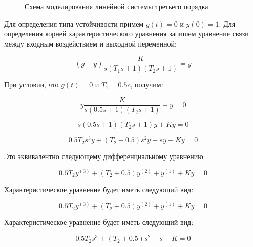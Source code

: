 \documentclass[a4paper, 11pt]{article}
\begin{document}
\begin{figure}[h!]
\caption{Схема моделирования линейной системы третьего порядка}
\label{ris:image}
\end{figure}

\par
	Для определения типа устойчивости примем $g(t)=0$ и  $y(0)=1$. Для определения корней характеристического уравнения запишем уравнение связи между входным воздействием и выходной переменной:
\par 
\begin{equation}
\displaystyle (g-y)\frac{K}{s(T_1s+1)(T_2s+1)}=y
\end{equation}

\par 
При условии, что $g(t)=0$ и $T_1=0.5c$, получим:
\par 
\begin{equation}
\displaystyle y\frac{K}{s(0.5s+1)(T_2s+1)}+y=0
\end{equation}

\par 
\begin{equation}
\displaystyle s(0.5s+1)(T_2s+1)y+Ky=0
\end{equation}

\par 
\begin{equation}
\displaystyle 0.5T_2s^3y+(T_2+0.5)s^2y+sy+Ky=0
\end{equation}

\par 
Это эквивалентно следующему дифференциальному уравнению:
\par 
\begin{equation}
\displaystyle 0.5T_2y^{(3)}+(T_2+0.5)y^{(2)}+y^{(1)}+Ky=0
\end{equation}

\par 
Характеристическое уравнение будет иметь следующий вид:
\par 
\begin{equation}
\displaystyle 0.5T_2y^{(3)}+(T_2+0.5)y^{(2)}+y^{(1)}+Ky=0
\end{equation}

\par 
Характеристическое уравнение будет иметь следующий вид:
\par 
\begin{equation}
\displaystyle 0.5T_2s^3+(T_2+0.5)s^2+s+K=0
\end{equation}
\end{document}
